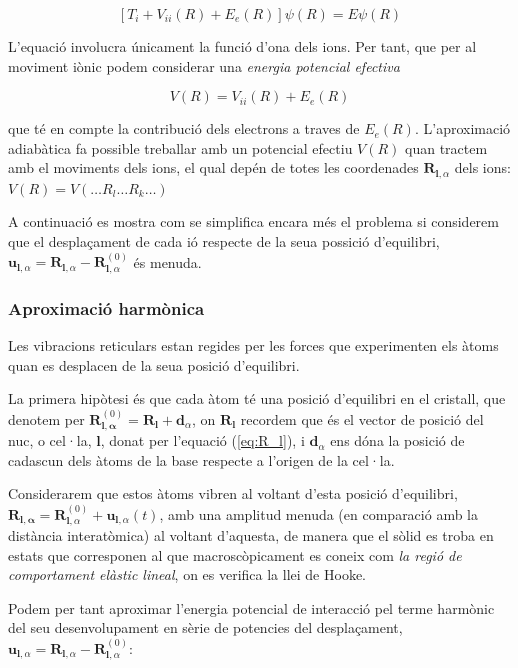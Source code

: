 \documentclass[12pt]{article} %
\let\vec\mathbf %
\begin{document}
\begin{equation}
 \left[T_i+V_{ii}(R)+E_e(R)\right]\psi(R)=E \psi(R)
\end{equation}

L'equació involucra únicament la funció d'ona dels ions. Per tant, que per al moviment iònic podem considerar una \emph{energia potencial efectiva}

\begin{equation}
 V(R)=V_{ii}(R)+E_e(R)
\end{equation}

que té en compte la contribució dels electrons a traves de $E_e(R)$. L'aproximació adiabàtica fa possible treballar amb un potencial efectiu $V(R)$ quan tractem amb el moviments dels ions, el qual depén de totes les coordenades $\vec R_{\vec l, \alpha}$ dels ions: $V(R)=V(\ldots R_l\ldots R_k\ldots)$

A continuació es mostra  com se simplifica encara més el problema si considerem que el desplaçament de cada ió respecte de la seua possició d'equilibri, $\vec u_{\vec l,\alpha}=\vec R_{\vec l,\alpha}-\vec R_{\vec l,\alpha}^{(0)}$ és menuda.
  
\subsubsection{Aproximació harmònica}

Les vibracions reticulars estan regides per les forces que experimenten els àtoms quan es desplacen de la seua posició d'equilibri. 

La primera hipòtesi és que cada àtom té una posició d'equilibri en el cristall, que denotem per $\vec R^{(0)}_{\vec l,\vec\alpha}=\vec R_\vec l+\vec d_\alpha$, on $\vec R_\vec l$ recordem que és el vector de posició del nuc, o cel·la, $\vec l$, donat per l'equació (\ref{eq:R_l}), i $\vec d_\alpha$ ens dóna la posició de cadascun dels àtoms de la base respecte a l'origen de la cel·la. 

Considerarem que estos àtoms vibren al voltant d'esta posició d'equilibri, $\vec R_{\vec l,\vec\alpha}=\vec R^{(0)}_{\vec l,\alpha}+\vec u_{\vec l,\alpha}(t)$, amb una amplitud menuda (en comparació amb la distància interatòmica) al voltant d'aquesta,   de manera que el sòlid es troba en estats que corresponen al que macroscòpicament es coneix com \textit{la regió de comportament elàstic lineal}, on es verifica la llei de Hooke.

Podem per tant aproximar l'energia potencial de interacció pel terme harmònic del seu desenvolupament en sèrie de potencies del desplaçament, $\vec u_{\vec l,\alpha}=\vec R_{\vec l,\alpha}-\vec R^{(0)}_{\vec l,\alpha}$:
\end{document}
